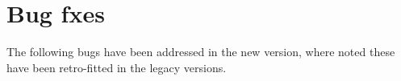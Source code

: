 \chapter{Bug fxes}
\label{chp:bugfixes}
The following bugs have been addressed in the new version, where noted these have been retro-fitted in the legacy versions.

